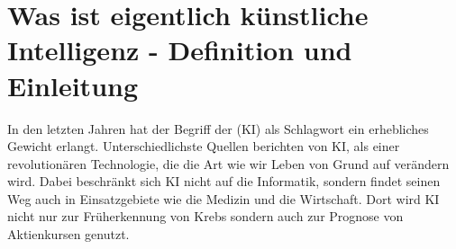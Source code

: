 \documentclass[12pt,german,ngerman]{report}
\begin{document}
    \tableofcontents
    \newpage


\chapter{Was ist eigentlich künstliche Intelligenz - Definition und Einleitung}


    In den letzten Jahren hat der Begriff der  (KI) als Schlagwort ein erhebliches Gewicht
    erlangt. Unterschiedlichste Quellen berichten von KI, als einer revolutionären Technologie, die die
    Art wie wir Leben von Grund auf verändern wird. 
    Dabei beschränkt sich KI nicht auf die Informatik, sondern findet seinen Weg auch in
    Einsatzgebiete wie die Medizin und die Wirtschaft. Dort wird KI nicht nur zur Früherkennung
    von Krebs sondern auch zur Prognose von Aktienkursen genutzt.\\
\end{document}
